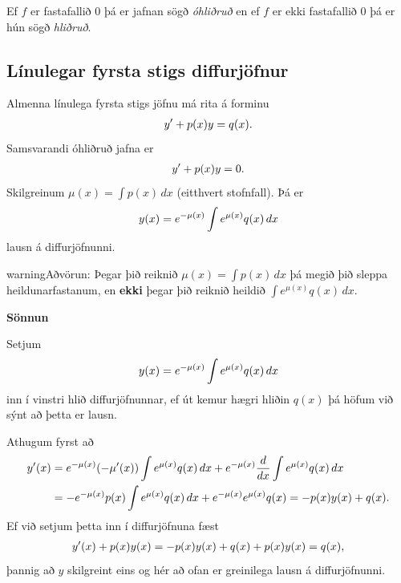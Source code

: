 \documentclass[b5paper,10pt,icelandic]{sphinxmanual}
\begin{document}
Ef \(f\) er fastafallið \(0\) þá er jafnan sögð \textit{óhliðruð}
en ef \(f\) er ekki fastafallið \(0\) þá er hún
sögð \textit{hliðruð}.


\subsection{Línulegar fyrsta stigs diffurjöfnur}
\label{kafli08:id2}\label{kafli08:index-4}
Almenna línulega fyrsta stigs jöfnu má rita á forminu
\begin{gather}
\begin{split}y'+p(x)y=q(x).\end{split}\notag
\end{gather}
Samsvarandi óhliðruð jafna er
\begin{gather}
\begin{split}y'+p(x)y=0.\end{split}\notag
\end{gather}
Skilgreinum \(\mu(x)=\int p(x)\,dx\) (eitthvert stofnfall). Þá er
\begin{gather}
\begin{split}y(x)=e^{-\mu(x)}\int e^{\mu(x)}q(x)\,dx\end{split}\notag
\end{gather}
lausn á diffurjöfnunni.

\begin{notice}{warning}{Aðvörun:}
Þegar þið reiknið \(\mu(x)=\int p(x)\,dx\) þá megið þið sleppa
heildunarfastanum, en \textbf{ekki} þegar þið reiknið heildið
\(\int e^{\mu(x)}q(x)\,dx\).
\end{notice}

\textbf{Sönnun}

Setjum
\begin{gather}
\begin{split}y(x)=e^{-\mu(x)}\int e^{\mu(x)}q(x)\,dx\end{split}\notag
\end{gather}
inn í vinstri hlið diffurjöfnunnar, ef út kemur hægri hliðin \(q(x)\) þá
höfum við sýnt að þetta er lausn.

Athugum fyrst að
\begin{gather}
\begin{split}\begin{aligned}
y'(x) &=e^{-\mu(x)}(-\mu'(x)) \int e^{\mu(x)}q(x)\, dx + e^{-\mu(x)} \frac{d}{dx} \int e^{\mu(x)}q(x)\,dx \\
&= -e^{-\mu(x)}p(x)\int e^{\mu(x)}q(x)\, dx +  e^{-\mu(x)} e^{\mu(x)}q(x) = -p(x)y(x) + q(x).
\end{aligned}\end{split}\notag
\end{gather}
Ef við setjum þetta inn í diffurjöfnuna fæst
\begin{gather}
\begin{split}y'(x) + p(x)y(x) = -p(x)y(x) + q(x) + p(x)y(x) = q(x),\end{split}\notag
\end{gather}
þannig að \(y\) skilgreint eins og hér að ofan er greinilega lausn á diffurjöfnunni.
\end{document}
